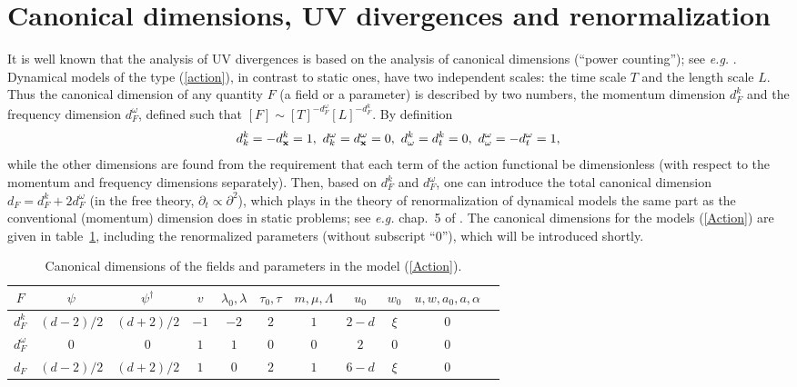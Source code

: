 \documentclass[12pt]{iopart}
\begin{document}
\section{Canonical dimensions, UV divergences and renormalization}
\label{sec:Reno}


It is well known that the analysis of UV divergences is based on
the analysis of canonical dimensions (``power counting''); see
{\it e.g.} \cite{Zinn,Book3}. Dynamical models of the type
(\ref{action}), in contrast to static ones, have two independent
scales: the time scale $T$ and the length scale $L$. Thus the
canonical dimension of any quantity $F$ (a field or a parameter)
is described by two numbers, the momentum dimension $d_{F}^{k}$
and the frequency dimension $d_{F}^{\omega}$, defined
such that $[F] \sim [T]^{-d_{F}^{\omega}} [L]^{-d_{F}^{k}}$.
By definition
\[ d_k^k=-d_{\bf x}^k=1,\ d_k^{\omega} =d_{\bf x}^{\omega }=0,\
d_{\omega }^k=d_t^k=0, \ d_{\omega }^{\omega }=-d_t^{\omega }=1, \]
while the other dimensions are found from the requirement that each
term of the action functional be dimensionless (with
respect to the momentum and frequency dimensions separately).
Then, based on $d_{F}^{k}$ and $d_{F}^{\omega}$, one can introduce
the total canonical dimension $d_{F}=d_{F}^{k}+2d_{F}^{\omega}$
(in the free theory, $\partial_{t}\propto\partial^{2}$), which
plays in the theory of renormalization of dynamical models the
same part as the conventional (momentum) dimension does in static
problems; see {\it e.g.} chap.~5 of \cite{Book3}. The canonical dimensions
for the models (\ref{Action}) are given in table~\ref{table1},
including the renormalized parameters (without subscript ``0''), which
will be introduced shortly.


\begin{table}[h!]
\caption{Canonical dimensions of the fields and parameters in the
model (\protect\ref{Action}).}
\label{table1}
\begin{center}
\begin{tabular}{|c|c|c|c|c|c|c|c|c|c|c|}
\hline
$F$  & $\psi$ & $\psi^\dagger$ & $v$ & $\lambda_0,\lambda$ & $\tau_0,\tau$ &
$m,\mu,\Lambda$ & $u_0$ & $w_0$ & $u,w,a_0,a,\alpha$ \\
\hline
$d_F^k$  & $(d-2)/2$ &  $(d+2)/2$ & $-1$ & $-2$ & $2$ & $1$ & $2-d$ &
$\xi$ & $0$ \\
\hline
$d_F^\omega$ & 0 & 0 & $1$ & $1$ & $0$ & $0$ & $2$ & $0$ & $0$ \\
\hline
$d_F$ & $(d-2)/2$ & $(d+2)/2$ & $1$ & $0$ & $2$ & $1$ & $6-d$ &
$\xi$ & $0$ \\
\hline
\end{tabular}
\end{center}
\end{table}
\end{document}
